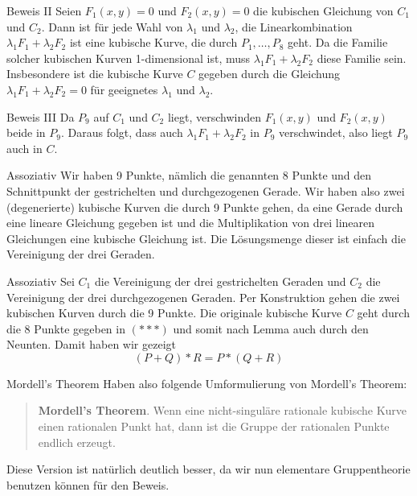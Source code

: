 \documentclass{beamer}
\begin{document}
\begin{frame}{Beweis II}
    Seien \(F_{1}(x,y)=0\) und \(F_{2}(x,y)=0\) die kubischen Gleichung von \(C_{1}\) und \(C_{2}\). Dann ist für jede Wahl von \(\lambda_{1}\) und \(\lambda_{2}\), die Linearkombination \(\lambda_{1}F_{1}+\lambda_{2}F_{2}\) ist eine kubische Kurve, die durch \(P_{1},\dots,P_{8}\) geht. Da die Familie solcher kubischen Kurven 1-dimensional ist, muss \(\lambda_{1}F_{1}+\lambda_{2}F_{2}\) diese Familie sein. Insbesondere ist die kubische Kurve \(C\) gegeben durch die Gleichung \(\lambda_{1}F_{1}+\lambda_{2}F_{2}=0\) für geeignetes \(\lambda_{1}\) und \(\lambda_{2}\).
\end{frame}

\begin{frame}{Beweis III}
    Da \(P_{9}\) auf \(C_{1}\) und \(C_{2}\) liegt, verschwinden \(F_{1}(x,y)\) und \(F_{2}(x,y)\) beide in \(P_{9}\). Daraus folgt, dass auch \(\lambda_{1}F_{1}+\lambda_{2}F_{2}\) in \(P_{9}\) verschwindet, also liegt \(P_{9}\) auch in \(C\).
\end{frame}

\begin{frame}{Assoziativ}
    Wir haben 9 Punkte, nämlich die genannten 8 Punkte und den Schnittpunkt der gestrichelten und durchgezogenen Gerade. Wir haben also zwei (degenerierte) kubische Kurven die durch 9 Punkte gehen, da eine Gerade durch eine lineare Gleichung gegeben ist und die Multiplikation von drei linearen Gleichungen eine kubische Gleichung ist. Die Lösungsmenge dieser ist einfach die Vereinigung der drei Geraden.
\end{frame}

\begin{frame}{Assoziativ}
    Sei \(C_{1}\) die Vereinigung der drei gestrichelten Geraden und \(C_{2}\) die Vereinigung der drei durchgezogenen Geraden. Per Konstruktion gehen die zwei kubischen Kurven durch die 9 Punkte. Die originale kubische Kurve \(C\) geht durch die 8 Punkte gegeben in \((\ast\ast\ast)\) und somit nach Lemma auch durch den Neunten. Damit haben wir gezeigt
    \[(P+Q)\ast R=P\ast(Q+R)\]
\end{frame}

\begin{frame}{Mordell's Theorem}
    Haben also folgende Umformulierung von Mordell's Theorem:
    \begin{quote}
        \textbf{Mordell's Theorem}. Wenn eine nicht-singuläre rationale kubische Kurve einen rationalen Punkt hat, dann ist die Gruppe der rationalen Punkte endlich erzeugt.
    \end{quote}
    Diese Version ist natürlich deutlich besser, da wir nun elementare Gruppentheorie benutzen können für den Beweis.
\end{frame}
\end{document}

